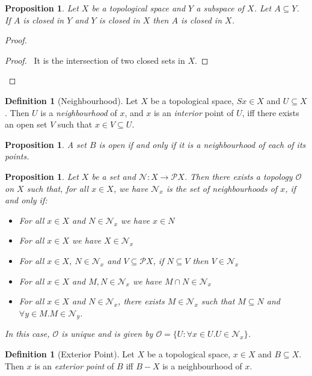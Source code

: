 \documentclass{book}
\let\qed\relax
\newtheorem{prop}[ax]{Proposition}
\theoremstyle{definition}
\newtheorem{df}[ax]{Definition}
\begin{document}
\begin{prop}
Let $X$ be a topological space and $Y$ a subspace of $X$. Let $A \subseteq Y$. If $A$ is closed in $Y$ and $Y$ is closed in $X$ then $A$ is closed in $X$.
\end{prop}

\begin{proof}
\pf
{}
\begin{proof}
	\pf\ It is the intersection of two closed sets in $X$.
\end{proof}
\qed
\end{proof}

\begin{df}[Neighbourhood]
Let $X$ be a topological space, $Sx \in X$ and $U \subseteq X$. Then $U$ is a \emph{neighbourhood} of $x$, and $x$ is an \emph{interior} point of $U$, iff there exists an open set $V$ such that $x \in V \subseteq U$.
\end{df}

\begin{prop}
A set $B$ is open if and only if it is a neighbourhood of each of its points.
\end{prop}

\begin{prop}
Let $X$ be a set and $\mathcal{N} : X \rightarrow \mathcal{P} X$. Then there exists a topology $\mathcal{O}$ on $X$ such that, for all $x \in X$, we have $\mathcal{N}_x$ is the set of neighbourhoods of $x$, if and only if:
\begin{itemize}
\item For all $x \in X$ and $N \in \mathcal{N}_x$ we have $x \in N$
\item For all $x \in X$ we have $X \in \mathcal{N}_x$
\item For all $x \in X$, $N \in \mathcal{N}_x$ and $V \subseteq \mathcal{P} X$, if $N \subseteq V$ then $V \in \mathcal{N}_x$
\item For all $x \in X$ and $M, N \in \mathcal{N}_x$ we have $M \cap N \in \mathcal{N}_x$
\item For all $x \in X$ and $N \in \mathcal{N}_x$, there exists $M \in \mathcal{N}_x$ such that $M \subseteq N$ and $\forall y \in M. M \in \mathcal{N}_y$.
\end{itemize}
In this case, $\mathcal{O}$ is unique and is given by $\mathcal{O} = \{ U : \forall x \in U. U \in \mathcal{N}_x \}$.
\end{prop}

\begin{df}[Exterior Point]
Let $X$ be a topological space, $x \in X$ and $B \subseteq X$. Then $x$ is an \emph{exterior point} of $B$ iff $B - X$ is a neighbourhood of $x$.
\end{df}
\end{document}
